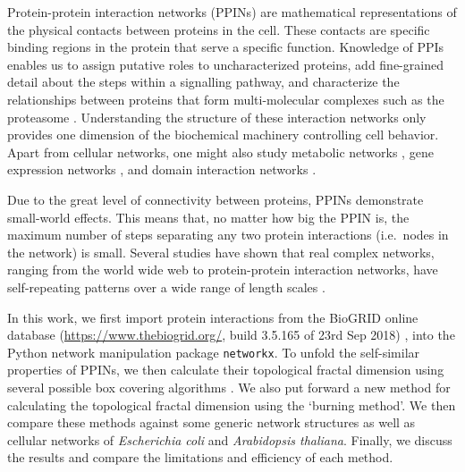\documentclass[9pt,onecolumn,twoside]{pnas-new}
\begin{document}
Protein-protein interaction networks (PPINs) are mathematical representations of the physical contacts between proteins in the cell. 
These contacts are specific binding regions in the protein that serve a specific function. 
Knowledge of PPIs enables us to assign putative roles to uncharacterized proteins, add fine-grained detail about the steps within a signalling pathway, and characterize the relationships between proteins that form multi-molecular complexes such as the proteasome \cite{embl_networkanalysis}.
Understanding the structure of these interaction networks only provides one dimension of the biochemical machinery controlling cell behavior. Apart from cellular networks, one might also study metabolic networks \cite{zhu2005structural}, gene expression networks \cite{bergmann2003similarities}, and domain interaction networks \cite{wuchty2006stable}.

Due to the great level of connectivity between proteins, PPINs demonstrate small-world effects.
This means that, no matter how big the PPIN is, the maximum number of steps separating any two protein interactions (i.e.\ nodes in the network) is small.
Several studies have shown that real complex networks, ranging from the world wide web to protein-protein interaction networks, 
have self-repeating patterns over a wide range of length scales \cite{song2004, concas2006, song2007}.

In this work, we first import protein interactions from the BioGRID online database (\url{https://www.thebiogrid.org/}, build 3.5.165 of 23rd Sep 2018) \cite{biogrid2017}, into the Python network manipulation package \texttt{networkx}. To unfold the self-similar properties of PPINs, we then calculate their topological fractal dimension using several possible box covering algorithms \cite{song2004,concas2006,song2007,zhang2014}. 
We also put forward a new method for calculating the topological fractal dimension using the `burning method'. 
We then compare these methods against some generic network structures as well as cellular networks of \emph{Escherichia coli} and \emph{Arabidopsis thaliana}. 
Finally, we discuss the results and compare the limitations and efficiency of each method.
\end{document}
